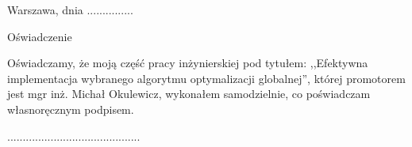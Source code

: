 \documentclass[12pt, twoside, openany, abstract=on]{report}
\theoremstyle{definition}
\begin{document}
\clearpage
\pagestyle{empty}
\noindent Warszawa, dnia ...............
\vspace{5cm}
\begin{center}
\LARGE{Oświadczenie}
\end{center}
Oświadczamy, że moją część pracy inżynierskiej pod tytułem: ,,Efektywna implementacja wybranego algorytmu optymalizacji globalnej'', której promotorem jest mgr inż. Michał Okulewicz, wykonałem samodzielnie, co poświadczam własnoręcznym podpisem.
\vspace{2cm}
\begin{flushright}
...........................................
\end{flushright}
\end{document}

